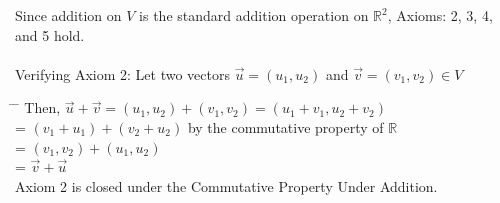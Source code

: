 \documentclass[addpoints]{exam}
\begin{document}
\begin{tcolorbox}[colback=cyan!5!white,colframe=cyan!75!black,title=1. c) Solution]
Since addition on $V$ is the standard addition operation on $\mathbb{R}^2$, Axioms: 2, 3, 4, and 5 hold.\\ \\
Verifying Axiom 2: \space \space \space Let two vectors $\vec{u} = (u_1,u_2)$ and $\vec{v}=(v_1,v_2) \in V$      
\begin{tabbing}
\hspace*{10em}\= \hspace*{2em} \= \kill %
    \>   Then, $\vec{u}+\vec{v} = (u_1, u_2) +(v_1,v_2) = (u_1+v_1, u_2+v_2)$ \\
    \> \hspace{5.4em} =  $(v_1+u_1) + (v_2+u_2)$ by the commutative property of $\mathbb{R}$\\
    \> \hspace{5.4em} = $(v_1,v_2)+(u_1,u_2)$\\
    \> \hspace{5.4em} = $\vec{v}+\vec{u}$\\
    Axiom 2 is closed under the Commutative Property Under Addition.
\end{tabbing}
\end{tcolorbox}
\end{document}
